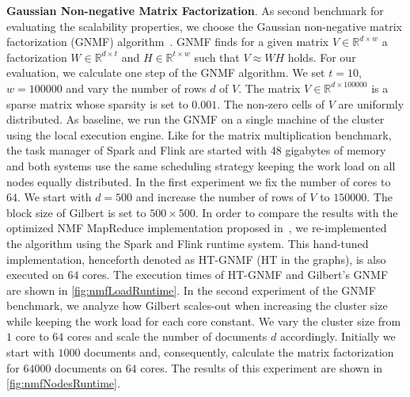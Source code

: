 \textbf{Gaussian Non-negative Matrix Factorization}. As second benchmark for evaluating the scalability properties, we choose the Gaussian non-negative matrix factorization (GNMF) algorithm~\cite{seung:anips2001a}.
GNMF finds for a given matrix $V \in \mathbb{R}^{d\times w}$ a factorization $W \in \mathbb{R}^{d\times t}$ and $H \in \mathbb{R}^{t\times w}$ such that $V\approx W H$ holds.
For our evaluation, we calculate one step of the GNMF algorithm.
We set $t=10$, $w=100000$ and vary the number of rows $d$ of $V$.
The matrix $V\in\mathbb{R}^{d\times 100000}$ is a sparse matrix whose sparsity is set to $0.001$.
The non-zero cells of $V$ are uniformly distributed.
As baseline, we run the GNMF on a single machine of the cluster using the local execution engine.
Like for the matrix multiplication benchmark, the task manager of Spark and Flink are started with 48 gigabytes of memory and both systems use the same scheduling strategy keeping the work load on all nodes equally distributed.
In the first experiment we fix the number of cores to $64$.
We start with $d=500$ and increase the number of rows of $V$ to $150000$.
The block size of Gilbert is set to $500 \times 500$.
In order to compare the results with the optimized NMF MapReduce implementation proposed in~\cite{liu:2010a}, we re-implemented the algorithm using the Spark and Flink runtime system.
This hand-tuned implementation, henceforth denoted as HT-GNMF (HT in the graphs), is also executed on $64$ cores.
The execution times of HT-GNMF and Gilbert's GNMF are shown in \cref{fig:nmfLoadRuntime}.
In the second experiment of the GNMF benchmark, we analyze how Gilbert scales-out when increasing the cluster size while keeping the work load for each core constant.
We vary the cluster size from $1$ core to $64$ cores and scale the number of documents $d$ accordingly.
Initially we start with $1000$ documents and, consequently, calculate the matrix factorization for $64000$ documents on $64$ cores.
The results of this experiment are shown in \cref{fig:nmfNodesRuntime}.

